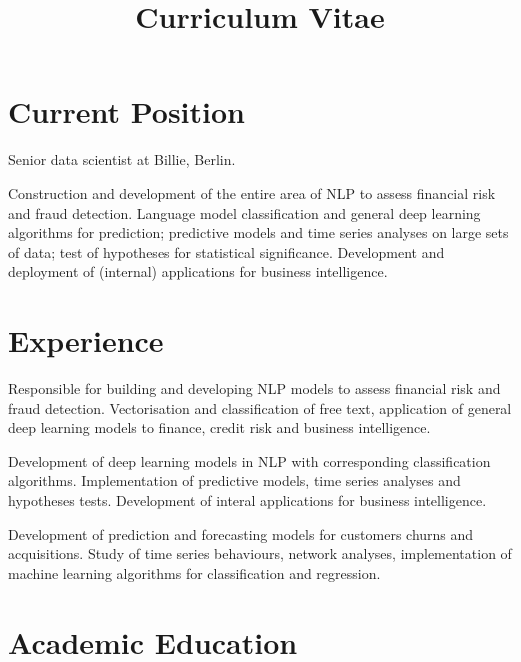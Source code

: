 \documentclass[11pt,a4paper,sans]{moderncv}
\title{Curriculum Vitae}
\begin{document}
 \makecvtitle %


\section{Current Position} Senior data scientist at Billie, Berlin.

\bigskip Construction and development of the entire area of NLP to assess
financial risk and fraud detection. Language model classification and general
deep learning algorithms for prediction; predictive models and time series
analyses on large sets of data; test of hypotheses for statistical significance.
Development and deployment of (internal) applications for business intelligence.

\section{Experience} 
 {
Responsible for building and developing NLP
models to assess financial risk and fraud detection.  Vectorisation and
classification of free text, application of general deep learning models to
finance, credit risk and business intelligence.}

 {
Development of deep learning models in NLP with corresponding classification algorithms. 
Implementation of predictive models, time series analyses and hypotheses tests. Development of
interal applications for business intelligence.}

 {Development
of prediction and forecasting models for customers churns and acquisitions.
Study of time series behaviours, network analyses, implementation of machine
learning algorithms for classification and regression.}



\section{Academic Education} 
\end{document}
